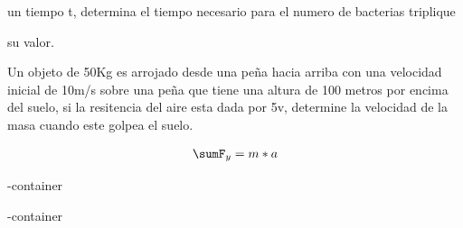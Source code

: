 \documentclass{article}
\begin{document}
un tiempo t, determina el tiempo necesario para el numero de bacterias triplique

su valor.







Un objeto de 50Kg  es arrojado desde una peña hacia arriba con una velocidad inicial de 10m/s sobre una peña que tiene una altura de 100 metros por encima del suelo, si la resitencia del aire esta dada por 5v, determine la velocidad de la masa cuando este golpea el suelo.


\begin{gather*}
\sumF_{y} = m*a
\end{gather*}


\image-container



\image-container
\end{document}
